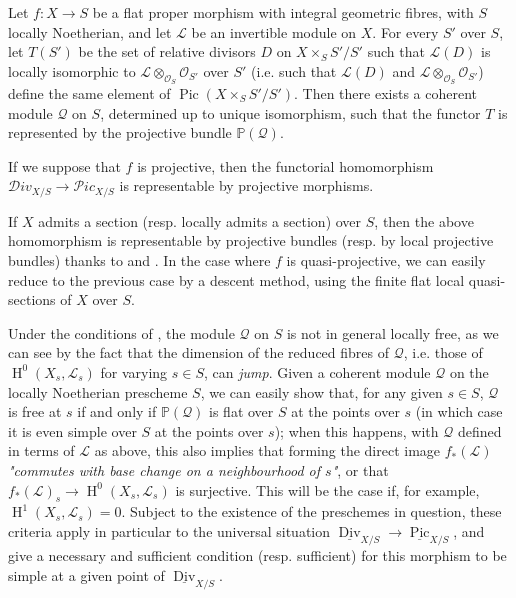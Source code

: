 \begin{theorem}\label{fga3.v-4-theorem-4.3}
    Let $f\colon X\to S$ be a flat proper morphism with integral geometric fibres, with $S$ locally Noetherian, and let $\mathcal{L}$ be an invertible module on $X$.
    For every $S'$ over $S$, let $T(S')$ be the set of relative divisors $D$ on $X\times_S S'/S'$ such that $\mathcal{L}(D)$ is locally isomorphic to $\mathcal{L}\otimes_{\mathcal{O}_S}\mathcal{O}_{S'}$ over $S'$ (i.e. such that $\mathcal{L}(D)$ and $\mathcal{L}\otimes_{\mathcal{O}_S}\mathcal{O}_{S'}$) define the same element of $\operatorname{Pic}(X\times_S S'/S')$.
    Then there exists a coherent module $\mathcal{Q}$ on $S$, determined up to unique isomorphism, such that the functor $T$ is represented by the projective bundle $\mathbb{P}(\mathcal{Q})$.
\end{theorem}


\begin{corollary}\label{fga3.v-4-corollary-4.4}
    If we suppose that $f$ is projective, then the functorial homomorphism $\mathcal{D}iv_{X/S}\to\mathcal{P}ic_{X/S}$ is representable by projective morphisms.
\end{corollary}


If $X$ admits a section (resp. locally admits a section) over $S$, then the above homomorphism is representable by projective bundles (resp. by local projective bundles) thanks to  and .
In the case where $f$ is quasi-projective, we can easily reduce to the previous case by a descent method, using the finite flat local quasi-sections of $X$ over $S$.



\begin{remark}\label{fga3.v-4-remark-4.5}
    Under the conditions of , the module $\mathcal{Q}$ on $S$ is not in general locally free, as we can see by the fact that the dimension of the reduced fibres of $\mathcal{Q}$, i.e. those of $\operatorname{H}^0(X_s,\mathcal{L}_s)$ for varying $s\in S$, can \emph{jump}.
    Given a coherent module $\mathcal{Q}$ on the locally Noetherian prescheme $S$, we can easily show that, for any given $s\in S$, $\mathcal{Q}$ is free at $s$ if and only if $\mathbb{P}(\mathcal{Q})$ is flat over $S$ at the points over $s$ (in which case it is even simple over $S$ at the points over $s$);
    when this happens, with $\mathcal{Q}$ defined in terms of $\mathcal{L}$ as above, this also implies that forming the direct image $f_*(\mathcal{L})$ \emph{"commutes with base change on a neighbourhood of $s$"}, or that $f_*(\mathcal{L})_s\to\operatorname{H}^0(X_s,\mathcal{L}_s)$ is surjective.
    This will be the case if, for example, $\operatorname{H}^1(X_s,\mathcal{L}_s)=0$.
    Subject to the existence of the preschemes in question, these criteria apply in particular to the universal situation $\underline{\operatorname{Div}}_{X/S}\to\underline{\operatorname{Pic}}_{X/S}$, and give a necessary and sufficient condition (resp. sufficient) for this morphism to be simple at a given point of $\underline{\operatorname{Div}}_{X/S}$.
\end{remark}